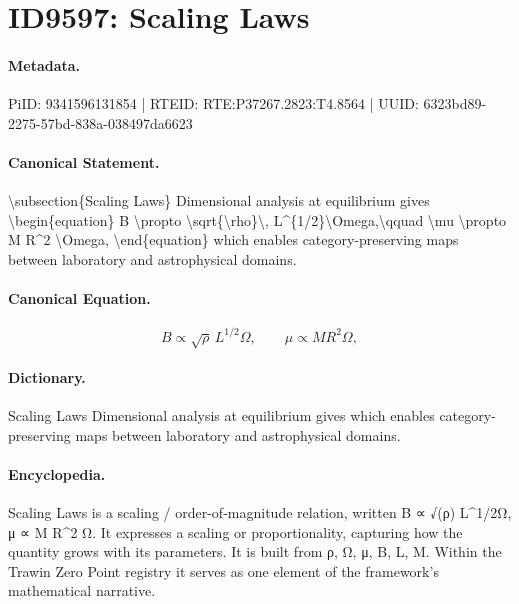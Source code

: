 \section*{ID9597: Scaling Laws}
\paragraph{Metadata.}
PiID: 9341596131854 | RTEID: RTE:P37267.2823:T4.8564 | UUID: 6323bd89-2275-57bd-838a-038497da6623

\paragraph{Canonical Statement.}
\textbackslash{}subsection\{Scaling Laws\} Dimensional analysis at equilibrium gives \textbackslash{}begin\{equation\} B \textbackslash{}propto \textbackslash{}sqrt\{\textbackslash{}rho\}\textbackslash{}, L\textasciicircum{}\{1/2\}\textbackslash{}Omega,\textbackslash{}qquad \textbackslash{}mu \textbackslash{}propto M R\textasciicircum{}2 \textbackslash{}Omega, \textbackslash{}end\{equation\} which enables category-preserving maps between laboratory and astrophysical domains.

\paragraph{Canonical Equation.}
\[
B \propto \sqrt{\rho}\, L^{1/2}\Omega,\qquad \mu \propto M R^2 \Omega,
\]

\paragraph{Dictionary.}
Scaling Laws Dimensional analysis at equilibrium gives which enables category-preserving maps between laboratory and astrophysical domains.

\paragraph{Encyclopedia.}
Scaling Laws is a scaling / order-of-magnitude relation, written B ∝ √(ρ) L\textasciicircum{}1/2Ω, μ ∝ M R\textasciicircum{}2 Ω. It expresses a scaling or proportionality, capturing how the quantity grows with its parameters. It is built from ρ, Ω, μ, B, L, M. Within the Trawin Zero Point registry it serves as one element of the framework's mathematical narrative.
